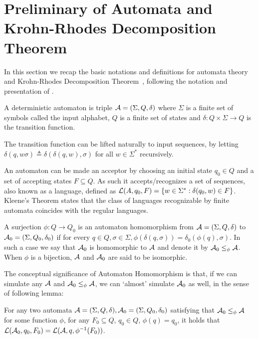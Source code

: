 \section{Preliminary of Automata and Krohn-Rhodes Decomposition Theorem}\label{appsec:prelim_automata}

In this section we recap the basic notations and definitions for automata theory and Krohn-Rhodes Decomposition Theorem~\citep{krohn1965algebraic}, following the notation and presentation of \citet{maler2010krohn}. 

\begin{definition}[Automaton]\label{defi:automaton}
	A deterministic automaton is triple ${\mathcal{A}} = (\Sigma,Q,\delta)$ where
$\Sigma$ is a finite set of symbols called the input alphabet, $Q$ is a finite set of states and
$\delta : Q \times \Sigma \to Q$ is the transition function.
\end{definition}

The transition function can be lifted naturally to input sequences, by letting $\delta(q, w\sigma) \triangleq \delta(\delta(q, w), \sigma)$ for all $w\in \Sigma^*$ recursively.

An automaton can be made an acceptor by choosing an initial state $q_0 \in Q$ and a set of accepting states $F \subseteq Q$. As such it accepts/recognizes a set of sequences, also known as a language, defined as ${\mathcal{L}}(A,q_0,F) = \{  w\in\Sigma^* : \delta(q_0, w) \in F\}$. Kleene’s Theorem states that the class of languages recognizable by finite automata coincides with the regular
languages.


\begin{definition}
	A surjection $\phi : Q \to Q_0$
is an automaton homomorphism from ${\mathcal{A}} = (\Sigma, Q, \delta)$ to ${\mathcal{A}}_0 = (\Sigma, Q_0, \delta_0)$ if for every $q \in Q, \sigma \in \Sigma,\phi(\delta(q, \sigma)) = \delta_0(\phi(q), \sigma)$.
In such a case we say that ${\mathcal{A}}_0$
is homomorphic to ${\mathcal{A}}$ and denote it by ${\mathcal{A}}_0 \le_\phi {\mathcal{A}}$. When $\phi$
is a bijection, ${\mathcal{A}}$ and ${\mathcal{A}}_0$ are said to be isomorphic.
\end{definition} 

The conceptual significance of Automaton Homomorphism is that, if we can simulate any ${\mathcal{A}}$ and ${\mathcal{A}}_0 \le_\phi {\mathcal{A}}$, we can `almost' simulate ${\mathcal{A}}_0$ as well, in the sense of following lemma:

\begin{lemma}\label{lem:automata_homo}
	For any two automata ${\mathcal{A}}= (\Sigma, Q, \delta),{\mathcal{A}}_0 = (\Sigma, Q_0, \delta_0)$ satisfying that ${\mathcal{A}}_0 \le_\phi {\mathcal{A}}$ for some function $\phi$,  for any $F_0\subseteq Q$, $q_0\in Q$, $\phi(q) = q_0$, it holds that $ {\mathcal{L}}({\mathcal{A}}_0,q_0,F_0) = {\mathcal{L}}({\mathcal{A}},q,\phi^{-1}(F_0))$.
\end{lemma}

